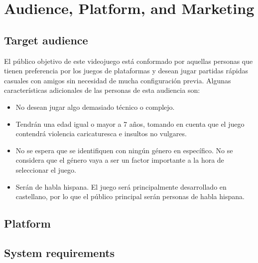 \chapter{Audience, Platform, and Marketing}

\section{Target audience}%

El público objetivo de este videojuego está conformado por aquellas personas que
tienen preferencia por los juegos de plataformas y desean jugar partidas rápidas
casuales con amigos sin necesidad de mucha configuración previa. Algunas
características adicionales de las personas de esta audiencia son:

\begin{itemize}
    \item No desean jugar algo demasiado técnico o complejo.
    \item Tendrán una edad igual o mayor a 7 años, tomando en cuenta que el
    juego contendrá violencia caricaturesca e insultos no vulgares.
    \item No se espera que se identifiquen con ningún género en específico. No se considera que el género
    vaya a ser un factor importante a la hora de seleccionar el juego.
    \item Serán de habla hispana. El juego será principalmente desarrollado en
    castellano, por lo que el público principal serán personas de habla hispana.
\end{itemize}

\section{Platform} %

\section{System requirements} %

